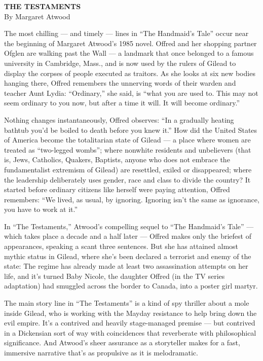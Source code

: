 \textbf{THE TESTAMENTS}\\
By Margaret Atwood

The most chilling --- and timely --- lines in ``The Handmaid's Tale''
occur near the beginning of Margaret Atwood's 1985 novel. Offred and her
shopping partner Ofglen are walking past the Wall --- a landmark that
once belonged to a famous university in Cambridge, Mass., and is now
used by the rulers of Gilead to display the corpses of people executed
as traitors. As she looks at six new bodies hanging there, Offred
remembers the unnerving words of their warden and teacher Aunt Lydia:
``Ordinary,'' she said, is ``what you are used to. This may not seem
ordinary to you now, but after a time it will. It will become
ordinary.''

Nothing changes instantaneously, Offred observes: ``In a gradually
heating bathtub you'd be boiled to death before you knew it.'' How did
the United States of America become the totalitarian state of Gilead ---
a place where women are treated as ``two-legged wombs''; where nonwhite
residents and unbelievers (that is, Jews, Catholics, Quakers, Baptists,
anyone who does not embrace the fundamentalist extremism of Gilead) are
resettled, exiled or disappeared; where the leadership deliberately uses
gender, race and class to divide the country? It started before ordinary
citizens like herself were paying attention, Offred remembers: ``We
lived, as usual, by ignoring. Ignoring isn't the same as ignorance, you
have to work at it.''

In ``The Testaments,'' Atwood's compelling sequel to ``The Handmaid's
Tale'' --- which takes place a decade and a half later --- Offred makes
only the briefest of appearances, speaking a scant three sentences. But
she has attained almost mythic status in Gilead, where she's been
declared a terrorist and enemy of the state: The regime has already made
at least two assassination attempts on her life, and it's turned Baby
Nicole, the daughter Offred (in the TV series adaptation) had smuggled
across the border to Canada, into a poster girl martyr.

The main story line in ``The Testaments'' is a kind of spy thriller
about a mole inside Gilead, who is working with the Mayday resistance to
help bring down the evil empire. It's a contrived and heavily
stage-managed premise --- but contrived in a Dickensian sort of way with
coincidences that reverberate with philosophical significance. And
Atwood's sheer assurance as a storyteller makes for a fast, immersive
narrative that's as propulsive as it is melodramatic.

